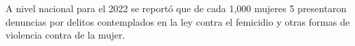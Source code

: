 A nivel nacional para el 2022 se reportó que de cada 1,000 mujeres 5 presentaron denuncias por delitos contemplados en la ley contra el femicidio y otras formas de violencia contra de la mujer.